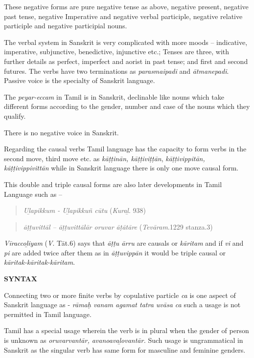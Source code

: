 These negative forms are pure negative tense as above, negative present, negative past tense, negative Imperative and negative verbal participle, negative relative participle and negative participial nouns.

The verbal system in Sanskrit is very complicated with more moods – indicative, imperative, subjunctive, benedictive, injunctive etc.; Tenses are three, with further details as perfect, imperfect and aorist in past tense; and first and second futures. The verbs have two terminations as \textit{parasmaipadi} and \textit{ātmanepadi}. Passive voice is the specialty of Sanskrit language.

The \textit{peyar-eccam} in Tamil is in Sanskrit, declinable like nouns which take different forms according to the gender, number and case of the nouns which they qualify.

There is no negative voice in Sanskrit. 

Regarding the causal verbs Tamil language has the capacity to form verbs in the second move, third move etc. as \textit{kāṭṭinān, kāṭṭiviṭṭān}, \textit{kāṭṭivippitān, kāṭṭivippivittān} while in Sanskrit language there is only one move causal form.

This double and triple causal forms are also later developments in Tamil Language such as –

\begin{verse}
\textit{Uḻapikkum - Uḻapikkuñ cūtu} (\textit{Kuraḻ}. 938)
\end{verse}

\begin{verse}
\textit{āṭṭuvittāl – āṭṭuvittālār oruvar āṭātāre} (\textit{Tevāram}.1229 stanza.3)
\end{verse}

\textit{Vīraccoḻiyam} (\textit{V}. Tāt.6) says that \textit{āṭṭu ārru} are causals or \textit{kāritam} and if \textit{vi} and\textit{ pi} are added twice after them as in \textit{āṭṭuvippān} it would be triple causal or \textit{kāritak-kāritak-kāritam}.

\textbf{SYNTAX}

Connecting two or more finite verbs by copulative particle \textit{ca} is one aspect of Sanskrit language as - \textit{rāmaḥ vanam agamat tatra uvāsa ca} such a usage is not permitted in Tamil language.

Tamil has a special usage wherein the verb is in plural when the gender of person is unknown as \textit{oruvarvantār, avanoavaḻovantār.} Such usage is ungrammatical in Sanskrit as the singular verb has same form for masculine and feminine genders.


